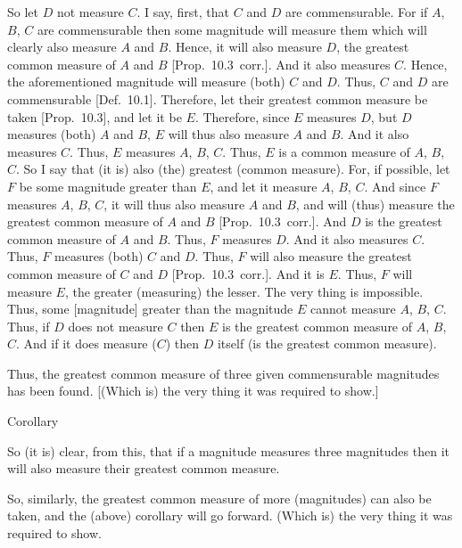 \begin{Parallel}{}{}
{So let $D$ not measure $C$. I say, first, that $C$ and $D$ are
commensurable. For if $A$, $B$, $C$ are commensurable then some
magnitude will measure them which will clearly also measure $A$ and $B$.
Hence, it will also measure $D$, the greatest common measure of $A$ and $B$ [Prop.~10.3~corr.]. And it also measures
$C$. Hence, the aforementioned magnitude will measure (both)
$C$ and $D$. Thus, $C$ and $D$ are commensurable [Def.~10.1]. Therefore, let their
greatest common measure be taken [Prop.~10.3], and let it be $E$. Therefore, since
$E$ measures $D$, but $D$ measures (both) $A$ and $B$, $E$ will
thus also measure $A$ and $B$. And it also measures $C$. Thus,
$E$ measures $A$, $B$, $C$. Thus, $E$ is a common measure of $A$, $B$, $C$.  So I say that (it is) also (the) greatest (common measure). For, if
possible, let $F$ be some magnitude greater than $E$, and let it
measure $A$, $B$, $C$. And since $F$ measures $A$, $B$, $C$, it will
thus also measure $A$ and $B$, and  will (thus) measure the greatest common measure of $A$ and $B$ [Prop.~10.3~corr.].  And
$D$ is the greatest common measure of $A$ and $B$.  Thus, $F$ measures $D$. And it also measures $C$. Thus, $F$ measures (both) $C$ and $D$.
Thus, $F$ will also measure the greatest common measure of $C$ and $D$  [Prop.~10.3~corr.].
And it is $E$. Thus, $F$ will measure $E$, the greater (measuring)
the lesser. The very thing is impossible. Thus, some [magnitude]
greater than the magnitude $E$ cannot measure $A$, $B$, $C$. Thus,
if $D$ does not
measure $C$ then
$E$ is the greatest common measure of $A$, $B$, $C$.  And if it does measure ($C$) then $D$ itself (is the
greatest common measure).

Thus, the greatest common measure  of three given
commensurable magnitudes has been found.  [(Which is) the very thing it was required to
show.]\\

\begin{center}
{\large Corollary}
\end{center}\vspace*{-7pt}

So (it is) clear, from this, that if a magnitude measures three
magnitudes then it will also measure their greatest common measure.

So, similarly, the greatest common measure of more (magnitudes) can also be
taken, and the (above) corollary will go forward. (Which is) the very thing
it was required to show.}
\end{Parallel}

